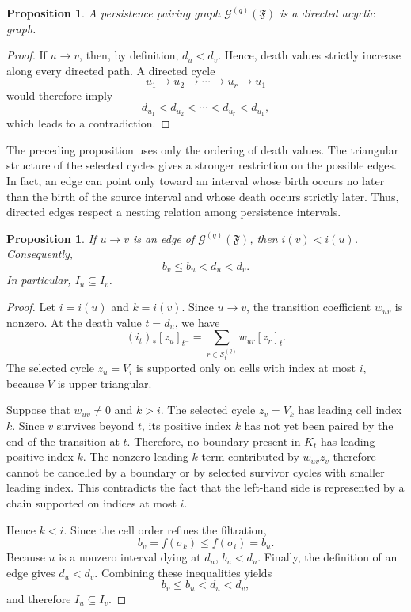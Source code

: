 \documentclass[11pt]{article}
\theoremstyle{paperdefinition}
\theoremstyle{paperplain}
\newtheorem{proposition}[definition]{Proposition}
\theoremstyle{paperremark}
\begin{document}
\begin{proposition}
\label{prop:pairing-graph-dag}
A persistence pairing graph $\mathcal G^{(q)}(\mathfrak F)$ is a directed acyclic graph.
\end{proposition}

\begin{proof}
If $u\longrightarrow v$, then, by definition, $d_u<d_v$. Hence, death values strictly increase along every directed path. A directed cycle
\[
u_1 \longrightarrow u_2 \longrightarrow \cdots \longrightarrow u_r \longrightarrow u_1
\]
would therefore imply
\[
d_{u_1} < d_{u_2} < \cdots < d_{u_r} < d_{u_1},
\]
which leads to a contradiction.
\end{proof}

The preceding proposition uses only the ordering of death values. The triangular structure of the selected cycles gives a stronger restriction on the possible edges. In fact, an edge can point only toward an interval whose birth occurs no later than the birth of the source interval and whose death occurs strictly later. Thus, directed edges respect a nesting relation among persistence intervals.

\begin{proposition}
\label{prop:edge-interval-containment}
If $u\longrightarrow v$ is an edge of $\mathcal G^{(q)}(\mathfrak F)$, then $i(v)<i(u)$. Consequently,
\[
b_v\leq b_u<d_u<d_v.
\]
In particular, $I_u\subseteq I_v$.
\end{proposition}

\begin{proof}
Let $i=i(u)$ and $k=i(v)$. Since $u\longrightarrow v$, the transition coefficient $w_{uv}$ is nonzero. At the death value $t=d_u$, we have
\[
(i_t)_*[z_u]_{t^-} = \sum_{r\in\mathcal S_t^{(q)}}w_{ur}[z_r]_t.
\]
The selected cycle $z_u=V_i$ is supported only on cells with index at most $i$, because $V$ is upper triangular.

Suppose that $w_{uv}\neq0$ and $k>i$. The selected cycle $z_v=V_k$ has leading cell index $k$. Since $v$ survives beyond $t$, its positive index $k$ has not yet been paired by the end of the transition at $t$. Therefore, no boundary present in $K_t$ has leading positive index $k$. The nonzero leading $k$-term contributed by $w_{uv}z_v$ therefore cannot be cancelled by a boundary or by selected survivor cycles with smaller leading index. This contradicts the fact that the left-hand side is represented by a chain supported on indices at most $i$.

Hence $k<i$. Since the cell order refines the filtration,
\[
b_v=f(\sigma_k)\leq f(\sigma_i)=b_u.
\]
Because $u$ is a nonzero interval dying at $d_u$, $b_u<d_u$. Finally, the definition of an edge gives $d_u<d_v$. Combining these inequalities yields
\[
b_v\leq b_u<d_u<d_v,
\]
and therefore $I_u\subseteq I_v$.
\end{proof}
\end{document}
